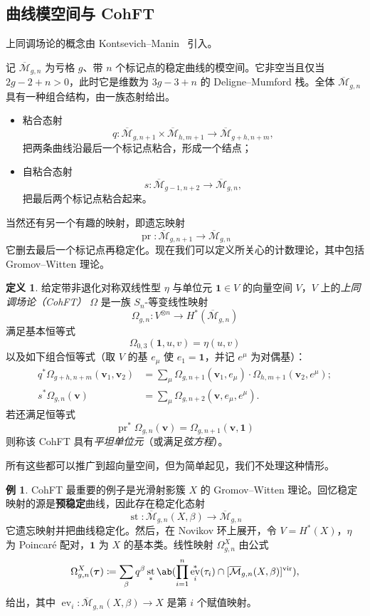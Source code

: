 \documentclass{amsart}
\theoremstyle{definition}
\newtheorem{defn}[thm]{定义}
\newtheorem{exm}[thm]{例}
\theoremstyle{remark}
\theoremstyle{plain}
\theoremstyle{definition}
\theoremstyle{remark}
\newcommand{\Mbar}{\overline{\mathcal{M}}}
\newcommand{\mbf}[1]{\mathbf{#1}}
\newcommand{\bv}{\mbf{v}}
\newcommand{\btau}{\bm{\tau}}
\newcommand{\mr}[1]{\mathrm{#1}}
\newcommand{\1}{\mathbf{1}}
\newcommand{\2}{\mathbf{2}}
\newcommand{\3}{\mathbf{3}}
\newcommand{\vir}{\mr{vir}}
\DeclareMathOperator{\ev}{ev}
\DeclareMathOperator{\st}{st}
\DeclareMathOperator{\pr}{pr}
\begin{document}
\subsection{曲线模空间与 CohFT}%
\label{sub:Moduli of curves and CohFTs}

上同调场论的概念由 Kontsevich--Manin~\cite{KM1994} 引入。

记 $\Mbar_{g,n}$ 为亏格 $g$、带 $n$ 个标记点的稳定曲线的模空间。它非空当且仅当 $2g-2+n > 0$，此时它是维数为 $3g-3+n$ 的 Deligne--Mumford 栈。全体 $\Mbar_{g,n}$ 具有一种组合结构，由一族态射给出。
\begin{itemize}
    \item 粘合态射
        \[q \colon \Mbar_{g,n+1} \times \Mbar_{h, m+1} \to \Mbar_{g+h,n+m}, \]
        把两条曲线沿最后一个标记点粘合，形成一个结点；
    \item 自粘合态射 \[s \colon \Mbar_{g-1,n+2} \to \Mbar_{g,n},\]
        把最后两个标记点粘合起来。
\end{itemize}
当然还有另一个有趣的映射，即遗忘映射
\[ \pr \colon \Mbar_{g,n+1} \to \Mbar_{g,n} \]
它删去最后一个标记点再稳定化。现在我们可以定义所关心的计数理论，其中包括 Gromov--Witten 理论。

\begin{defn}
    给定带非退化对称双线性型 $\eta$ 与单位元 $\1 \in V$ 的向量空间 $V$，$V$ 上的\textit{上同调场论（CohFT）} $\Omega$ 是一族 $S_n$-等变线性映射
    \[ \Omega_{g,n} \colon V^{\otimes n} \to H^*(\Mbar_{g,n}) \]
    满足基本恒等式
    \[ \Omega_{0,3}(\1, u,v) = \eta(u,v) \]
    以及如下组合恒等式（取 $V$ 的基 $e_{\mu}$ 使 $e_1 = \1$，并记 $e^{\mu}$ 为对偶基）：
    \begin{align*}
        q^* \Omega_{g+h,n+m}(\bv_1, \bv_2) &= \sum_{\mu} \Omega_{g,n+1}(\bv_1, e_{\mu}) \cdot \Omega_{h,m+1}(  \bv_2, e^{\mu} ); \\
        s^* \Omega_{g,n}(\bv) &= \sum_{\mu} \Omega_{g,n+2}(\bv, e_{\mu}, e^{\mu}).
    \end{align*}
    若还满足恒等式
    \[ \pr^*\Omega_{g,n}(\bv) = \Omega_{g,n+1}(\bv,\1) \]
    则称该 CohFT 具有\textit{平坦单位元}（或满足\textit{弦方程}）。
\end{defn}
所有这些都可以推广到超向量空间，但为简单起见，我们不处理这种情形。

\begin{exm}
    CohFT 最重要的例子是光滑射影簇 $X$ 的 Gromov--Witten 理论。回忆稳定映射的源是\textbf{预稳定}曲线，因此存在稳定化态射
    \[ \st \colon \Mbar_{g,n}(X,\beta) \to \Mbar_{g,n} \]
    它遗忘映射并把曲线稳定化。然后，在 Novikov 环上展开，令 $V = H^*(X)$，$\eta$ 为 Poincar\'e 配对，$\1$ 为 $X$ 的基本类。线性映射 $\Omega^X_{g,n}$ 由公式
    \[ \Omega_{g,n}^X(\btau) \coloneqq \sum_{\beta} q^{\beta} \st_* \ab(\prod_{i=1}^n \ev_i^*(\tau_i) \cap [\Mbar_{g,n}(X,\beta)]^{\vir}), \]
    给出，其中 $\ev_i \colon \Mbar_{g,n}(X,\beta) \to X$ 是第 $i$ 个赋值映射。
\end{exm}
\end{document}
